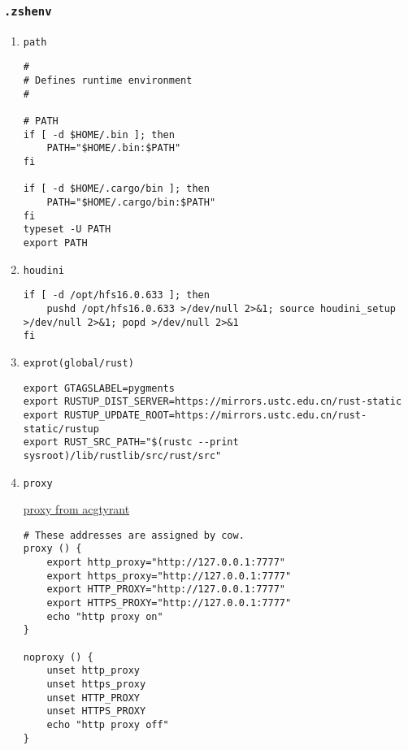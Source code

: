 \documentclass[11pt]{article}
\begin{document}
\subsubsection{\texttt{.zshenv}}
\label{sec:org87b132d}
\begin{enumerate}
\item \texttt{path}
\label{sec:org123c440}

\lstset{language=bash,label= ,caption= ,captionpos=b,numbers=none}
\begin{lstlisting}
#
# Defines runtime environment
#

# PATH
if [ -d $HOME/.bin ]; then
    PATH="$HOME/.bin:$PATH"
fi

if [ -d $HOME/.cargo/bin ]; then
    PATH="$HOME/.cargo/bin:$PATH"
fi
typeset -U PATH
export PATH
\end{lstlisting}

\item \texttt{houdini}
\label{sec:org3704350}

\lstset{language=bash,label= ,caption= ,captionpos=b,numbers=none}
\begin{lstlisting}
if [ -d /opt/hfs16.0.633 ]; then
    pushd /opt/hfs16.0.633 >/dev/null 2>&1; source houdini_setup >/dev/null 2>&1; popd >/dev/null 2>&1
fi
\end{lstlisting}

\item \texttt{exprot(global/rust)}
\label{sec:org3bc465b}

\lstset{language=bash,label= ,caption= ,captionpos=b,numbers=none}
\begin{lstlisting}
export GTAGSLABEL=pygments
export RUSTUP_DIST_SERVER=https://mirrors.ustc.edu.cn/rust-static
export RUSTUP_UPDATE_ROOT=https://mirrors.ustc.edu.cn/rust-static/rustup
export RUST_SRC_PATH="$(rustc --print sysroot)/lib/rustlib/src/rust/src"
\end{lstlisting}

\item \texttt{proxy}
\label{sec:orgc9c3c2a}

\href{https://github.com/acgtyrant/dotfiles}{proxy from acgtyrant}

\lstset{language=bash,label= ,caption= ,captionpos=b,numbers=none}
\begin{lstlisting}
# These addresses are assigned by cow.
proxy () {
    export http_proxy="http://127.0.0.1:7777"
    export https_proxy="http://127.0.0.1:7777"
    export HTTP_PROXY="http://127.0.0.1:7777"
    export HTTPS_PROXY="http://127.0.0.1:7777"
    echo "http proxy on"
}

noproxy () {
    unset http_proxy
    unset https_proxy
    unset HTTP_PROXY
    unset HTTPS_PROXY
    echo "http proxy off"
}
\end{lstlisting}
\end{enumerate}
\end{document}
